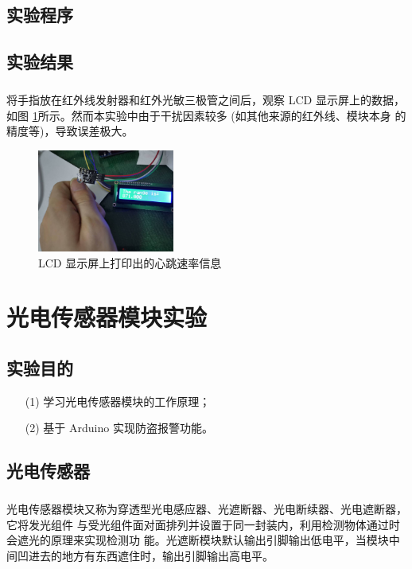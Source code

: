 \documentclass[UTF8, oneside]{ctexbook}
\begin{document}
\section{实验程序}


\section{实验结果}
\paragraph{}
将手指放在红外线发射器和红外光敏三极管之间后，观察 LCD 显示屏上的数据，如图
\ref{s22_1}所示。然而本实验中由于干扰因素较多 (如其他来源的红外线、模块本身
的精度等)，导致误差极大。
\begin{figure}[h]
    \centering
    \includegraphics[width=0.4\textwidth]{./result/sensor/22/result.jpg}
    \caption{LCD 显示屏上打印出的心跳速率信息}
    \label{s22_1}
\end{figure}

\chapter{光电传感器模块实验}
\section{实验目的}
\begin{itemize}
    \item[(1)] 学习光电传感器模块的工作原理；
    \item[(2)] 基于 Arduino 实现防盗报警功能。
\end{itemize}

\section{光电传感器}
\paragraph{}
光电传感器模块又称为穿透型光电感应器、光遮断器、光电断续器、光电遮断器，它将发光组件
与受光组件面对面排列并设置于同一封装内，利用检测物体通过时会遮光的原理来实现检测功
能。光遮断模块默认输出引脚输出低电平，当模块中间凹进去的地方有东西遮住时，输出引脚输出高电平。
\end{document}
